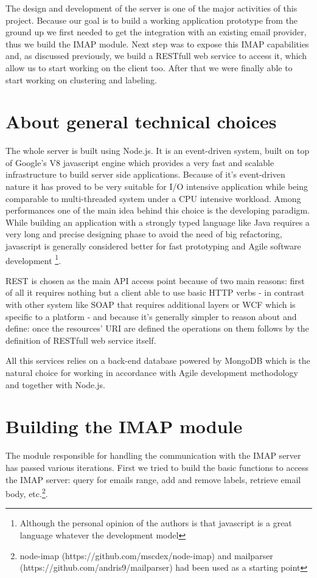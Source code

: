 \documentclass[a4paper,12pt]{report}
\begin{document}
The design and development of the server is one of the major activities of this project. Because our goal is to build a working application prototype from the ground up we first needed to get the integration with an existing email provider, thus we build the IMAP module. Next step was to expose this IMAP capabilities and, as discussed previously, we build a RESTfull web service to access it, which allow us to start working on the client too. After that we were finally able to start working on clustering and labeling.

\section{About general technical choices}
The whole server is built using Node.js. It is an event-driven system, built on top of Google's V8 javascript engine which provides a very fast and scalable infrastructure to build server side applications. Because of it's event-driven nature it has proved to be very suitable for I/O intensive application while being comparable to multi-threaded system under a CPU intensive workload. Among performances one of the main idea behind this choice is the developing paradigm. While building an application with a strongly typed language like Java requires a very long and precise designing phase to avoid the need of big refactoring, javascript is generally considered better for fast prototyping and Agile software development \footnote{Although the personal opinion of the authors is that javascript is a great language whatever the development model}.

REST is chosen as the main API access point because of two main reasons: first of all it requires nothing but a client able to use basic HTTP verbs - in contrast with other system like SOAP that requires additional layers or WCF which is specific to a platform - and because it's generally simpler to reason about and define: once the resources' URI are defined the operations on them follows by the definition of RESTfull web service itself. 

All this services relies on a back-end database powered by MongoDB which is the natural choice for working in accordance with Agile development methodology and together with Node.js.

\section{Building the IMAP module}
The module responsible for handling the communication with the IMAP server has passed various iterations.
First we tried to build the basic functions to access the IMAP server: query for emails range, add and remove labels, retrieve email body, etc.\footnote{node-imap (https://github.com/mscdex/node-imap) and mailparser (https://github.com/andris9/mailparser) had been used as a starting point}. 
\end{document}
